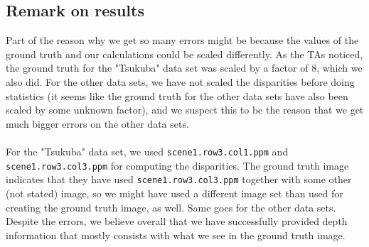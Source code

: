 \documentclass[12pt,a4paper,oneside,final]{article}
\begin{document}
\subsection{Remark on results}
Part of the reason why we get so many errors might be because the values of the ground truth and our calculations could be scaled differently. As the TAs noticed, the ground truth for the "Tsukuba" data set was scaled by a factor of 8, which we also did. For the other data sets, we have not scaled the disparities before doing statistics (it seems like the ground truth for the other data sets have also been scaled by some unknown factor), and we suspect this to be the reason that we get much bigger errors on the other data sets. \\\\ For the "Tsukuba" data set, we used \texttt{scene1.row3.col1.ppm} and \texttt{scene1.row3.col3.ppm} for computing the disparities. The ground truth image indicates that they have used \texttt{scene1.row3.col3.ppm} together with some other (not stated) image, so we might have used a different image set than used for creating the ground truth image, as well. Same goes for the other data sets. Despite the errors, we believe overall that we have successfully provided depth information that mostly consists with what we see in the ground truth image.
	
\end{document}
